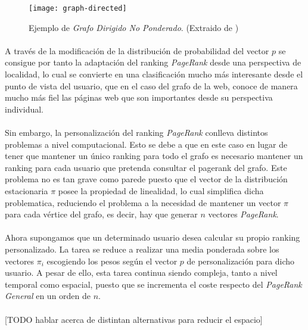 \documentclass{subfiles}
\begin{document}
      \begin{figure}
        \centering
        \texttt{[image: graph-directed]}
        \caption{Ejemplo de \emph{Grafo Dirigido No Ponderado}. (Extraido de \cite{freedman2010graphs})}
        \label{img:directed_graph_example}
      \end{figure}

      \paragraph{}
      A través de la modificación de la distribución de probabilidad del vector $p$ se consigue por tanto la adaptación del ranking \emph{PageRank} desde una perspectiva de localidad, lo cual se convierte en una clasificación mucho más interesante desde el punto de vista del usuario, que en el caso del grafo de la web, conoce de manera mucho más fiel las páginas web que son importantes desde su perspectiva individual.

      \paragraph{}
      Sin embargo, la personalización del ranking \emph{PageRank} conlleva distintos problemas a nivel computacional. Esto se debe a que en este caso en lugar de tener que mantener un único ranking para todo el grafo es necesario mantener un ranking para cada usuario que pretenda consultar el pagerank del grafo. Este problema no es tan grave como parede puesto que el vector de la distribución estacionaria $\pi$ posee la propiedad de linealidad, lo cual simplifica dicha problematica, reduciendo el problema a la necesidad de mantener un vector $\pi$ para cada vértice del grafo, es decir, hay que generar $n$ vectores \emph{PageRank}.

      \paragraph{}
      Ahora supongamos que un determinado usuario desea calcular su propio ranking personalizado. La tarea se reduce a realizar una media ponderada sobre los vectores $\pi_i$ escogiendo los pesos según el vector $p$ de personalización para dicho usuario. A pesar de ello, esta tarea continua siendo compleja, tanto a nivel temporal como espacial, puesto que se incrementa el coste respecto del \emph{PageRank General} en un orden de $n$.

      \paragraph{}
      [TODO hablar acerca de distintan alternativas para reducir el espacio]
\end{document}
